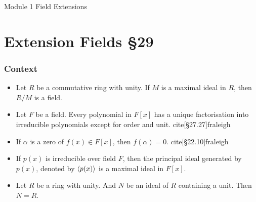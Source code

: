 



{\Large Module 1 Field Extensions}
\section{Extension Fields \S29}
\subsubsection*{Context}
\begin{itemize}
	\item Let $R$ be a commutative ring with unity.
		If $M$ is a maximal ideal in $R$, then $R/M$ is a field.
		\cite[\S27.9]{fraleigh}
	\item Let $F$ be a field.
		Every polynomial in $F[x]$ has a unique factorisation into irreducible polynomials except for order and unit.
		cite[\S27.27]{fraleigh}
	\item If $\alpha$ is a zero of $f(x) \in F[x]$, then $f(\alpha) = 0$.
		cite[\S22.10]{fraleigh}
	\item If $p(x)$ is irreducible over field $F$, then the principal ideal generated by $p(x)$, denoted by $\langle p(x)\rangle$ is a maximal ideal in $F[x]$.
		\cite[\S27.25]{fraleigh}
	\item Let $R$ be a ring with unity.
		And $N$ be an ideal of $R$ containing a unit.
		Then $N = R$.\cite[\S27.5]{fraleigh}
\end{itemize}

